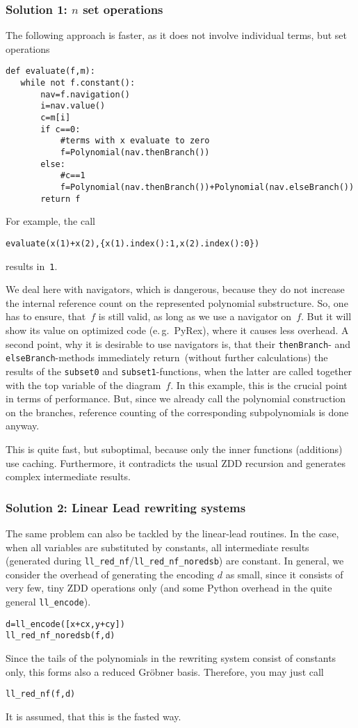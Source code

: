 \documentclass[]{article}
\begin{document}
\subsubsection{Solution 1: $n$ set operations}
The following approach is faster, as it does not involve individual terms, but set operations

\begin{verbatim}
def evaluate(f,m):
   while not f.constant():
       nav=f.navigation()
       i=nav.value()
       c=m[i]
       if c==0:
           #terms with x evaluate to zero
           f=Polynomial(nav.thenBranch())
       else:
           #c==1
           f=Polynomial(nav.thenBranch())+Polynomial(nav.elseBranch())
       return f   
\end{verbatim}
For example, the call
\begin{verbatim}
evaluate(x(1)+x(2),{x(1).index():1,x(2).index():0})  
\end{verbatim}
results in~\verb|1|.



We deal here with navigators, which is dangerous, because
they do not increase the internal reference count on the represented polynomial
substructure. So, one has
to ensure, that~$f$ is still valid, as long as we use a navigator on~$f$.
But it will show its value on optimized code (e.\,g.\ PyRex), where it causes
less overhead. 
A second point, why it is desirable to use navigators is, that their
\verb|thenBranch|- and \verb|elseBranch|-methods immediately return~(without
further calculations) the
results of the \verb|subset0| and \verb|subset1|-functions, when the latter are
called together  with the top variable of the diagram~$f$.
%
In this example, this is the crucial point in terms of performance.
But, since we already call the polynomial construction on the branches,
reference counting of the corresponding subpolynomials is done anyway.

This is quite fast, but suboptimal, because only the inner functions (additions) use caching.
%
Furthermore, it contradicts the usual ZDD recursion and generates complex intermediate results.

\subsubsection{Solution 2: Linear Lead rewriting systems}
The same problem can also be tackled by the linear-lead routines. In the case, when
all variables are substituted by  constants, all intermediate results
(generated during \verb|ll_red_nf|/\verb|ll_red_nf_noredsb|) are constant.
In general, we consider the overhead of generating the encoding $d$ as small, 
since it consists of very few, tiny ZDD operations only (and some Python overhead in the quite general \verb|ll_encode|).
\begin{verbatim}
d=ll_encode([x+cx,y+cy])
ll_red_nf_noredsb(f,d)
\end{verbatim}
%
%
Since the tails of the polynomials in the rewriting system   consist of
constants only, this forms also a
reduced Gröbner basis. Therefore, you may just call
\begin{verbatim}
ll_red_nf(f,d)   
\end{verbatim}
%
It is assumed, that this is the fasted way.
%
\end{document}
